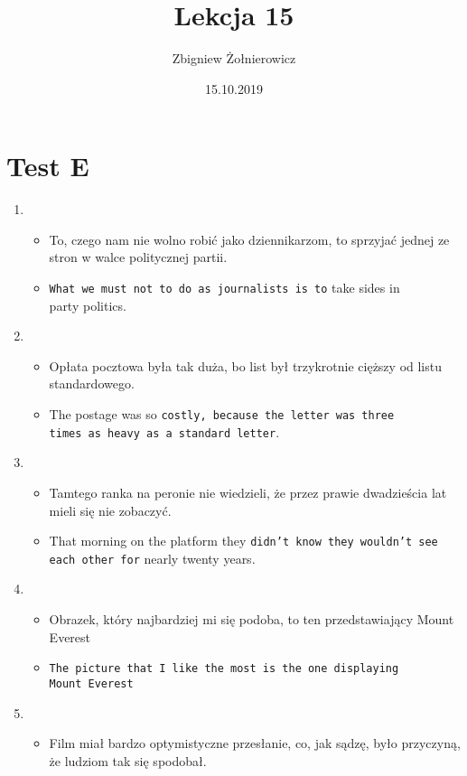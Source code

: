 \documentclass[a4paper]{article}
\begin{document}
\title{{\huge Lekcja 15}}
\author{Zbigniew Żołnierowicz}
\date{15.10.2019}
\maketitle
\section{Test E}
\begin{enumerate}
    \item \begin{itemize}
        \item To, czego nam nie wolno robić jako dziennikarzom, to sprzyjać jednej ze stron w walce politycznej partii.
        \item {\tt What we must not to do as journalists is to} take sides in\\party politics.
    \end{itemize}
    \item \begin{itemize}
        \item Opłata pocztowa była tak duża, bo list był trzykrotnie cięższy od listu standardowego.
        \item The postage was so {\tt costly, because the letter was three\\times as heavy as a standard letter}.
    \end{itemize}
    \item \begin{itemize}
        \item Tamtego ranka na peronie nie wiedzieli, że przez prawie dwadzieścia lat mieli się nie zobaczyć.
        \item That morning on the platform they {\tt didn't know they wouldn't see each other for} nearly twenty years.
    \end{itemize}
    \item \begin{itemize}
        \item Obrazek, który najbardziej mi się podoba, to ten przedstawiający Mount Everest
        \item {\tt The picture that I like the most is the one displaying\\Mount Everest}
    \end{itemize}
    \item \begin{itemize}
        \item Film miał bardzo optymistyczne przesłanie, co, jak sądzę, było przyczyną, że ludziom tak się spodobał.

\end{itemize}
\end{enumerate}
\end{document}
